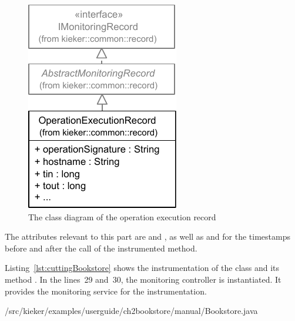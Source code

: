 \begin{figure}[H]
\begin{centering}
\includegraphics[scale=1]{images/kieker_OperationExecutionRecord-notraceattributes-inheritance}%
\caption{The class diagram of the operation execution record}
\label{fig:OperationExecutionRecordClassDiagram}
\end{centering}
\end{figure}

\noindent The attributes relevant to this part are  and , %
as well as  and  for %
the timestamps before and after the call of the instrumented method. 

\enlargethispage{0.7cm}

Listing~\ref{lst:cuttingBookstore} shows the instrumentation of the  class and its method . In the lines~29 and~30, the monitoring controller is instantiated. It provides the monitoring service for the instrumentation.


\setJavaCodeListing
%
{\manualInstrumentedBookstoreApplicationDir/src/kieker/examples/userguide/ch2bookstore/manual/Bookstore.java}
 
